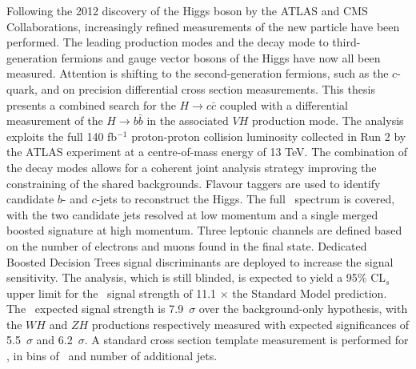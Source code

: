 Following the 2012 discovery of the Higgs boson by the ATLAS and CMS Collaborations, increasingly refined measurements of the new particle have been performed. The leading production modes and the decay mode to third-generation fermions and gauge vector bosons of the Higgs have now all been measured. Attention is shifting to the second-generation fermions, such as the $c$-quark, and on precision differential cross section measurements. This thesis presents a combined search for the $H \rightarrow c\bar{c}$ coupled with a differential measurement of the $H \rightarrow b\bar{b}$ in the associated $VH$ production mode. The analysis exploits the full 140 fb$^{-1}$ proton-proton collision luminosity collected in Run 2 by the ATLAS experiment at a centre-of-mass energy of 13 TeV. The combination of the decay modes allows for a coherent joint analysis strategy improving the constraining of the shared backgrounds. Flavour taggers are used to identify candidate $b$- and $c$-jets to reconstruct the Higgs. The full \pt\ spectrum is covered, with the two candidate jets resolved at low momentum and a single merged boosted signature at high momentum. Three leptonic channels are defined based on the number of electrons and muons found in the final state. Dedicated Boosted Decision Trees signal discriminants are deployed to increase the signal sensitivity. The analysis, which is still blinded, is expected to yield a 95\% CL$_s$ upper limit for the \vhc\ signal strength of 11.1 $\times$ the Standard Model prediction. The \vhb\ expected signal strength is 7.9~$\sigma$ over the background-only hypothesis, with the $WH$ and $ZH$ productions respectively measured with expected significances of 5.5~$\sigma$ and 6.2~$\sigma$. A standard cross section template measurement is performed for \vhb, in bins of \pt\ and number of additional jets.
\vspace*{\fill}
    